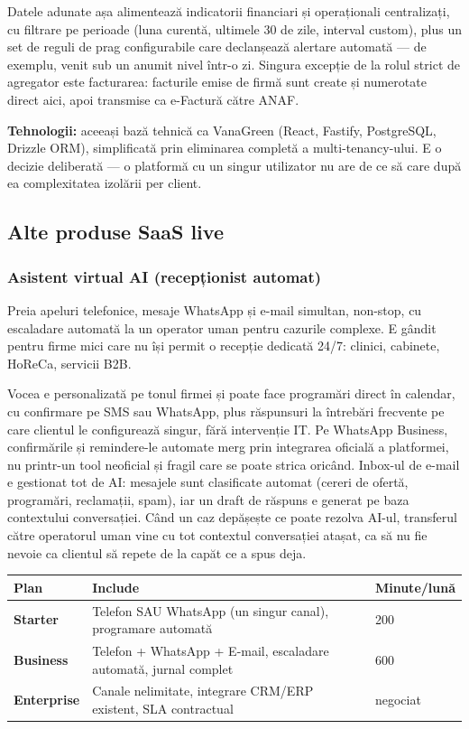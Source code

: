 \documentclass[11pt, a4paper]{article}
\begin{document}
Datele adunate așa alimentează indicatorii financiari și operaționali centralizați, cu filtrare
pe perioade (luna curentă, ultimele 30 de zile, interval custom), plus un set de reguli de prag
configurabile care declanșează alertare automată — de exemplu, venit sub un anumit nivel
într-o zi. Singura excepție de la rolul strict de agregator este facturarea: facturile emise de
firmă sunt create și numerotate direct aici, apoi transmise ca e-Factură către ANAF.

\textbf{Tehnologii:} aceeași bază tehnică ca VanaGreen (React, Fastify, PostgreSQL, Drizzle ORM),
simplificată prin eliminarea completă a multi-tenancy-ului. E o decizie deliberată — o platformă
cu un singur utilizator nu are de ce să care după ea complexitatea izolării per client.

\vspace{1em}
\subsection{Alte produse SaaS live}

\subsubsection{Asistent virtual AI (recepționist automat)}

Preia apeluri telefonice, mesaje WhatsApp și e-mail simultan, non-stop, cu escaladare automată
la un operator uman pentru cazurile complexe. E gândit pentru firme mici care nu își permit o
recepție dedicată 24/7: clinici, cabinete, HoReCa, servicii B2B.

Vocea e personalizată pe tonul firmei și poate face programări direct în calendar, cu confirmare
pe SMS sau WhatsApp, plus răspunsuri la întrebări frecvente pe care clientul le configurează
singur, fără intervenție IT. Pe WhatsApp Business, confirmările și remindere-le automate merg
prin integrarea oficială a platformei, nu printr-un tool neoficial și fragil care se poate strica
oricând. Inbox-ul de e-mail e gestionat tot de AI: mesajele sunt clasificate automat (cereri de
ofertă, programări, reclamații, spam), iar un draft de răspuns e generat pe baza contextului
conversației. Când un caz depășește ce poate rezolva AI-ul, transferul către operatorul uman
vine cu tot contextul conversației atașat, ca să nu fie nevoie ca clientul să repete de la
capăt ce a spus deja.

\renewcommand{\arraystretch}{1.3}
\begin{tabularx}{\textwidth}{>{\bfseries}l X X}
\toprule
Plan & Include & Minute/lună \\
\midrule
Starter & Telefon SAU WhatsApp (un singur canal), programare automată & 200 \\
Business & Telefon + WhatsApp + E-mail, escaladare automată, jurnal complet & 600 \\
Enterprise & Canale nelimitate, integrare CRM/ERP existent, SLA contractual & negociat \\
\bottomrule
\end{tabularx}
\end{document}
